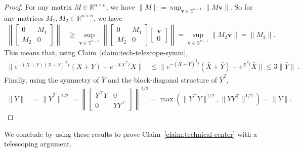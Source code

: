 \documentclass[11pt]{article} %
\newcommand{\R}{\mathbb{R}}
\renewcommand{\S}{\mathbb{S}}
\newcommand{\<}{\langle}
\renewcommand{\>}{\rangle}
\def\bv{{\boldsymbol v}}
\theoremstyle{plain}
\theoremstyle{definition}
\theoremstyle{remark}
\begin{document}
\begin{proof}
For any matrix $M \in \R^{n \times n}$, we have $\|M\| = \sup_{\bv \in \S^{n-1}} \|M \bv\|$. So for any matrices $M_1, M_2 \in \R^{n \times n}$, we have \begin{align*}
\left\|\begin{bmatrix} 0 & M_1 \\ M_2 & 0 \end{bmatrix} \right\| & \geq \sup_{\bv \in \S^{n-1}} \left\|\begin{bmatrix} 0 & M_1 \\ M_2 & 0 \end{bmatrix} \begin{bmatrix} \bv \\ 0 \end{bmatrix}\right\| = \sup_{\bv \in \S^{n-1}} \|M_2 \bv\| = \|M_2\|.
\end{align*}
This means that, using Claim~\ref{claim:tech-telescope-symm},
\begin{align*}
\|e^{-(X+Y)(X+Y)^{\top}t}(X+Y) - e^{-XX^{\top} t} X\| &\leq \|e^{-(\bar{X} + \bar{Y})^2 t}(\bar{X} + \bar{Y}) - e^{\bar{X}^2t} \bar{X}\| \leq 3\|\bar{Y}\|\,.
\end{align*}
Finally, using the symmetry of $\bar{Y}$ and the block-diagonal structure of $\bar{Y}^2$,
\begin{align*}\|\bar{Y}\| &= \|\bar{Y}^2\|^{1/2} = \left\|\begin{bmatrix} Y^{\top} Y & 0 \\ 0 & YY^{\top} \end{bmatrix} \right\|^{1/2} = \max(\|Y^{\top} Y\|^{1/2}, \|YY^{\top}\|^{1/2}) = \|Y\|.
\end{align*}

\end{proof}

We conclude by using these results to prove Claim~\ref{claim:technical-center} with a telescoping argument.
\end{document}
